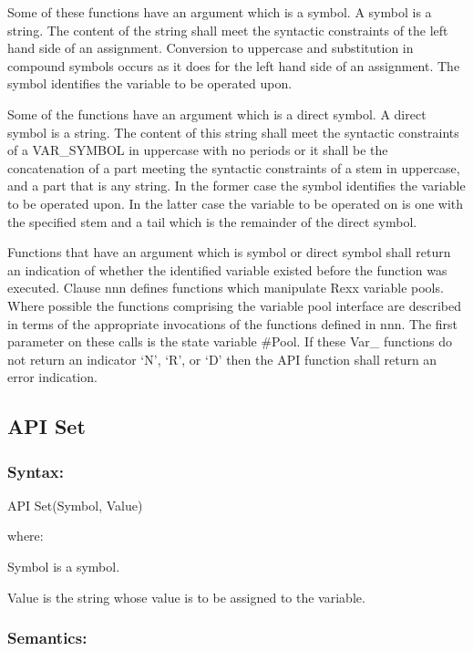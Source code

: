 Some of these functions have an argument which is a symbol. A symbol is
a string. The content of the string shall meet the syntactic constraints
of the left hand side of an assignment. Conversion to uppercase and
substitution in compound symbols occurs as it does for the left hand
side of an assignment. The symbol identifies the variable to be operated
upon.

Some of the functions have an argument which is a direct symbol. A
direct symbol is a string. The content of this string shall meet the
syntactic constraints of a VAR\_SYMBOL in uppercase with no periods or
it shall be the concatenation of a part meeting the syntactic
constraints of a stem in uppercase, and a part that is any string. In
the former case the symbol identifies the variable to be operated upon.
In the latter case the variable to be operated on is one with the
specified stem and a tail which is the remainder of the direct symbol.

Functions that have an argument which is symbol or direct symbol shall
return an indication of whether the identified variable existed before
the function was executed. Clause nnn defines functions which manipulate
Rexx variable pools. Where possible the functions comprising the
variable pool interface are described in terms of the appropriate
invocations of the functions defined in nnn. The first parameter on
these calls is the state variable \#Pool. If these Var\_ functions do
not return an indicator `N', `R', or `D' then the API function shall
return an error indication.

\subsection{API Set}\label{api-set}

\subsubsection{Syntax:}\label{syntax-50}

API Set(Symbol, Value)

where:

Symbol is a symbol.

Value is the string whose value is to be assigned to the variable.

\subsubsection{Semantics:}\label{semantics-51}


